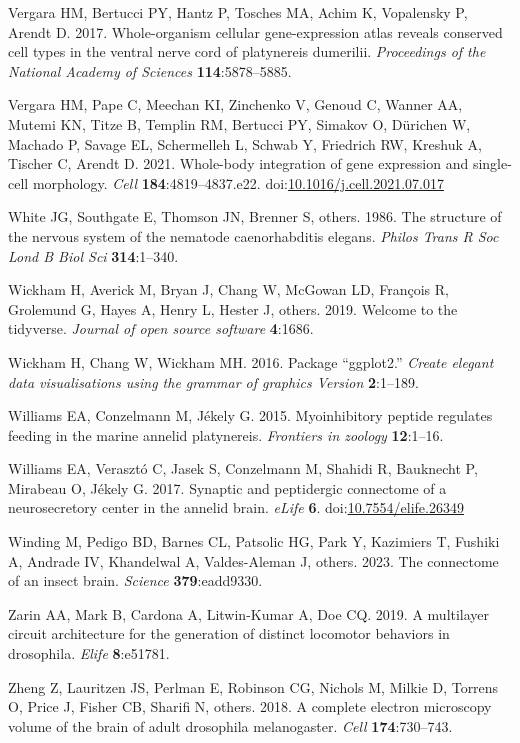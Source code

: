 \documentclass[
  11pt,
]{article}
\newlength{\cslhangindent}
\newenvironment{CSLReferences}[2] %
 {\begin{list}{}{%
  \setlength{\itemindent}{0pt}
  \setlength{\leftmargin}{0pt}
  \setlength{\parsep}{0pt}
  \ifodd #1
   \setlength{\leftmargin}{\cslhangindent}
   \setlength{\itemindent}{-1\cslhangindent}
  \fi
  \setlength{\itemsep}{#2\baselineskip}}}
 {\end{list}}
\begin{document}
\begin{CSLReferences}{1}{0}
Vergara HM, Bertucci PY, Hantz P, Tosches MA, Achim K, Vopalensky P,
Arendt D. 2017. Whole-organism cellular gene-expression atlas reveals
conserved cell types in the ventral nerve cord of platynereis dumerilii.
\emph{Proceedings of the National Academy of Sciences}
\textbf{114}:5878--5885.

Vergara HM, Pape C, Meechan KI, Zinchenko V, Genoud C, Wanner AA, Mutemi
KN, Titze B, Templin RM, Bertucci PY, Simakov O, Dürichen W, Machado P,
Savage EL, Schermelleh L, Schwab Y, Friedrich RW, Kreshuk A, Tischer C,
Arendt D. 2021. Whole-body integration of gene expression and
single-cell morphology. \emph{Cell} \textbf{184}:4819--4837.e22.
doi:\href{https://doi.org/10.1016/j.cell.2021.07.017}{10.1016/j.cell.2021.07.017}

White JG, Southgate E, Thomson JN, Brenner S, others. 1986. The
structure of the nervous system of the nematode caenorhabditis elegans.
\emph{Philos Trans R Soc Lond B Biol Sci} \textbf{314}:1--340.

Wickham H, Averick M, Bryan J, Chang W, McGowan LD, François R,
Grolemund G, Hayes A, Henry L, Hester J, others. 2019. Welcome to the
tidyverse. \emph{Journal of open source software} \textbf{4}:1686.

Wickham H, Chang W, Wickham MH. 2016. Package {``ggplot2.''}
\emph{Create elegant data visualisations using the grammar of graphics
Version} \textbf{2}:1--189.

Williams EA, Conzelmann M, Jékely G. 2015. Myoinhibitory peptide
regulates feeding in the marine annelid platynereis. \emph{Frontiers in
zoology} \textbf{12}:1--16.

Williams EA, Verasztó C, Jasek S, Conzelmann M, Shahidi R, Bauknecht P,
Mirabeau O, Jékely G. 2017. Synaptic and peptidergic connectome of a
neurosecretory center in the annelid brain. \emph{eLife} \textbf{6}.
doi:\href{https://doi.org/10.7554/elife.26349}{10.7554/elife.26349}

Winding M, Pedigo BD, Barnes CL, Patsolic HG, Park Y, Kazimiers T,
Fushiki A, Andrade IV, Khandelwal A, Valdes-Aleman J, others. 2023. The
connectome of an insect brain. \emph{Science} \textbf{379}:eadd9330.

Zarin AA, Mark B, Cardona A, Litwin-Kumar A, Doe CQ. 2019. A multilayer
circuit architecture for the generation of distinct locomotor behaviors
in drosophila. \emph{Elife} \textbf{8}:e51781.

Zheng Z, Lauritzen JS, Perlman E, Robinson CG, Nichols M, Milkie D,
Torrens O, Price J, Fisher CB, Sharifi N, others. 2018. A complete
electron microscopy volume of the brain of adult drosophila
melanogaster. \emph{Cell} \textbf{174}:730--743.

\end{CSLReferences}
\end{document}

